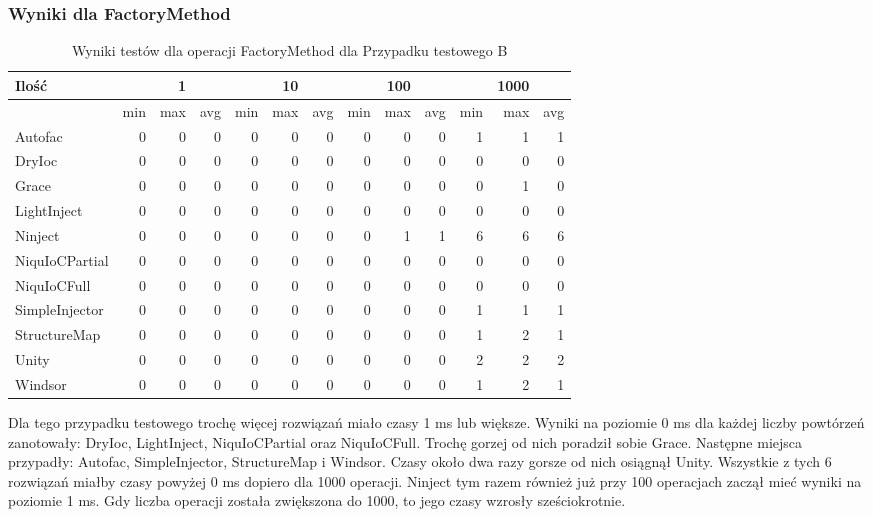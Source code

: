 \documentclass[12pt]{article}
\begin{document}
\subsubsection{Wyniki dla FactoryMethod}
\begin{table}[H]
\captionsetup{belowskip=0pt,aboveskip=0pt}
\begin{center}
\begin{small}
	\begin{tabular}{ | l | r r r | r r r | r r r | r r r | }
    		\hline
Ilość & & 1 & & & 10 & & & 100 & & & 1000 & \\ \hline
 & min & max & avg & min & max & avg & min & max & avg & min & max & avg \\ \hline
Autofac & 0 & 0 & 0 & 0 & 0 & 0 & 0 & 0 & 0 & 1 & 1 & 1 \\ \hline
DryIoc & 0 & 0 & 0 & 0 & 0 & 0 & 0 & 0 & 0 & 0 & 0 & 0 \\ \hline
Grace & 0 & 0 & 0 & 0 & 0 & 0 & 0 & 0 & 0 & 0 & 1 & 0 \\ \hline
LightInject & 0 & 0 & 0 & 0 & 0 & 0 & 0 & 0 & 0 & 0 & 0 & 0 \\ \hline
Ninject & 0 & 0 & 0 & 0 & 0 & 0 & 0 & 1 & 1 & 6 & 6 & 6 \\ \hline
NiquIoCPartial & 0 & 0 & 0 & 0 & 0 & 0 & 0 & 0 & 0 & 0 & 0 & 0 \\ \hline
NiquIoCFull & 0 & 0 & 0 & 0 & 0 & 0 & 0 & 0 & 0 & 0 & 0 & 0 \\ \hline
SimpleInjector & 0 & 0 & 0 & 0 & 0 & 0 & 0 & 0 & 0 & 1 & 1 & 1 \\ \hline
StructureMap & 0 & 0 & 0 & 0 & 0 & 0 & 0 & 0 & 0 & 1 & 2 & 1 \\ \hline
Unity & 0 & 0 & 0 & 0 & 0 & 0 & 0 & 0 & 0 & 2 & 2 & 2 \\ \hline
Windsor & 0 & 0 & 0 & 0 & 0 & 0 & 0 & 0 & 0 & 1 & 2 & 1 \\ \hline
  	\end{tabular}
\end{small}
\end{center}
\caption{Wyniki testów dla operacji FactoryMethod dla Przypadku testowego B}
\label{TestCaseB_FactoryMethod}
\end{table}
Dla tego przypadku testowego trochę więcej rozwiązań miało czasy 1 ms lub większe. Wyniki na poziomie 0 ms dla każdej liczby powtórzeń zanotowały: DryIoc, LightInject, NiquIoCPartial oraz NiquIoCFull. Trochę gorzej od nich poradził sobie Grace. Następne miejsca przypadły: Autofac, SimpleInjector, StructureMap i Windsor. Czasy około dwa razy gorsze od nich osiągnął Unity. Wszystkie z tych 6 rozwiązań miałby czasy powyżej 0 ms dopiero dla 1000 operacji. Ninject tym razem również już przy 100 operacjach zaczął mieć wyniki na poziomie 1 ms.  Gdy liczba operacji została zwiększona do 1000, to jego czasy wzrosły sześciokrotnie.
\end{document}
